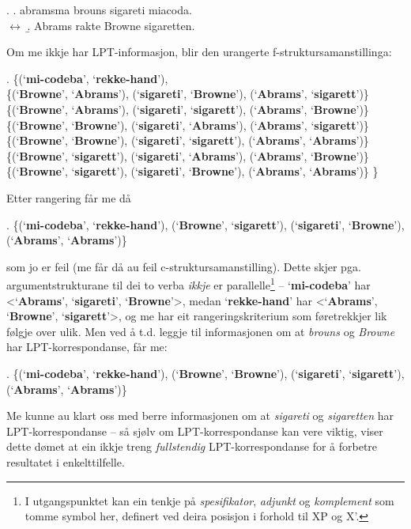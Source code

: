 \documentclass[12pt,a4paper,oneside,draft]{report}
\newcommand{\p}[1]{`\textbf{#1}'}
\begin{document}
\ex. \a. abramsma brouns sigareti miacoda.\\
     $\leftrightarrow$
     \b. Abrams rakte Browne sigaretten.
     
 Om me ikkje har LPT\hyp{}informasjon, blir den urangerte
 f\hyp{}struktursamanstillinga:

\ex. \{(\p{mi-codeba}, \p{rekke-hand}), \\
 \{(\p{Browne}, \p{Abrams}),   (\p{sigareti}, \p{Browne}),   (\p{Abrams}, \p{sigarett})\} \\
 \{(\p{Browne}, \p{Abrams}),   (\p{sigareti}, \p{sigarett}), (\p{Abrams}, \p{Browne})\} \\
 \{(\p{Browne}, \p{Browne}),   (\p{sigareti}, \p{Abrams}),   (\p{Abrams}, \p{sigarett})\} \\
 \{(\p{Browne}, \p{Browne}),   (\p{sigareti}, \p{sigarett}), (\p{Abrams}, \p{Abrams})\} \\
 \{(\p{Browne}, \p{sigarett}), (\p{sigareti}, \p{Abrams}),   (\p{Abrams}, \p{Browne})\} \\
 \{(\p{Browne}, \p{sigarett}), (\p{sigareti}, \p{Browne}),   (\p{Abrams}, \p{Abrams})\} \}

 Etter rangering får me då 

\ex. \{(\p{mi-codeba}, \p{rekke-hand}), (\p{Browne}, \p{sigarett}), (\p{sigareti}, \p{Browne}), (\p{Abrams}, \p{Abrams})\} 

 som jo er feil (me får då au feil c\hyp{}struktursamanstilling). Dette
 skjer pga. argumentstrukturane til dei to verba \emph{ikkje} er
 parallelle\footnote{I utgangspunktet kan ein tenkje på \emph{spesifikator}, \emph{adjunkt}
        og \emph{komplement} som tomme symbol her, definert ved deira
        posisjon i forhold til XP og X'. } -- \p{mi-codeba} har <\p{Abrams}, \p{sigareti},
 \p{Browne}>, medan \p{rekke-hand} har <\p{Abrams}, \p{Browne},
 \p{sigarett}>, og me har eit rangeringskriterium som føretrekkjer lik
 følgje over ulik. Men ved å t.d. leggje til informasjonen om at
 \emph{brouns} og \emph{Browne} har LPT\hyp{}korrespondanse, får me:

\ex. \{(\p{mi-codeba}, \p{rekke-hand}), (\p{Browne}, \p{Browne}), (\p{sigareti}, \p{sigarett}), (\p{Abrams}, \p{Abrams})\}

 Me kunne au klart oss med berre informasjonen om at \emph{sigareti} og
 \emph{sigaretten} har LPT\hyp{}korrespondanse -- så sjølv om LPT\hyp{}korrespondanse
 kan vere viktig, viser dette dømet at ein ikkje treng \emph{fullstendig}
 LPT\hyp{}korrespondanse for å forbetre resultatet i enkelttilfelle.
\end{document}
